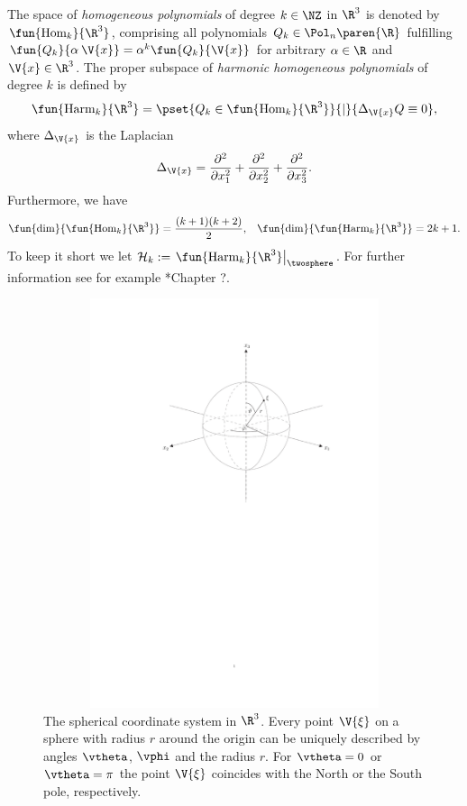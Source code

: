 The space of \emph{homogeneous polynomials} of degree $k \in \NZ$ in $\R^3$ is denoted by
$\fun{\text{Hom}_k}{\R^3}$, comprising all polynomials $Q_k \in \Pol_{n}\paren{\R}$ fulfilling 
$\fun{Q_k}{\alpha\:\V{x}} = \alpha^k \fun{Q_k}{\V{x}}$ for arbitrary $\alpha \in \R$ and $\V{x}
\in \R^3$. The proper subspace of \emph{harmonic homogeneous polynomials} of
degree $k$ is defined by
\begin{equation}
  \nonumber
  \fun{\text{Harm}_k}{\R^3} = \pset{Q_k \in \fun{\text{Hom}_k}{\R^3}}{|}{\Delta_{\V{x}} Q \equiv 0},
\end{equation}
where $\Delta_{\V{x}}$ is the Laplacian
\begin{equation}
  \nonumber
  \Delta_{\V{x}} = \frac{\partial^2}{\partial x_1^2} + \frac{\partial^2}{\partial x_2^2} +
  \frac{\partial^2}{\partial x_3^2}.
\end{equation}
Furthermore, we have
\begin{align}
  \nonumber
  \fun{\dim}{\fun{\text{Hom}_k}{\R^3}} & = \frac{(k+1)(k+2)}{2}, & 
  \fun{\dim}{\fun{\text{Harm}_k}{\R^3}} = 2k+1.
\end{align}
To keep it short we let $\mathcal{H}_k := \left.\fun{\text{Harm}_k}{\R^3}\right|_{\twosphere}$. For 
further information see for example \cite{frgesc}*{Chapter ?}.

\begin{figure}[htb]
  \centering
  \includegraphics[height=12cm,width=12cm]{images/sphere}
  \caption{The spherical coordinate system in $\R^3$. Every point $\V{\xi}$ on a
  sphere with radius $r$ around the origin can be uniquely described by angles 
  $\vtheta$, $\vphi$ and the radius $r$. For $\vtheta = 0$ or
  $\vtheta = \pi$ the point $\V{\xi}$ coincides with the North or the South
  pole, respectively.}
  \label{sphere}
\end{figure}


